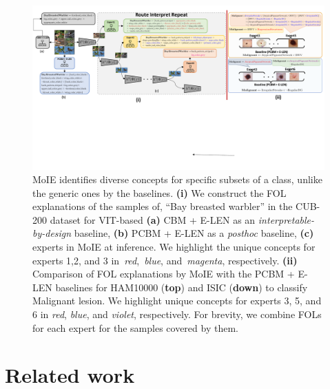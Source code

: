 \documentclass[nohyperref]{article}
\theoremstyle{plain}
\theoremstyle{definition}
\theoremstyle{remark}
\begin{document}
\begin{figure}[t]
\vskip 0.1in
\begin{center}
\centerline{\includegraphics[width=\linewidth]{figures/main/Results_all.pdf}}
\caption{MoIE identifies diverse concepts for specific subsets of a class, unlike the generic ones by the baselines. \textbf{(i)} We construct the FOL explanations of the samples of, ``Bay breasted warbler'' in the CUB-200 dataset for VIT-based \textbf{(a)} CBM + E-LEN as an \emph{interpretable-by-design} baseline, \textbf{(b)} PCBM + E-LEN as a \emph{posthoc} baseline, \textbf{(c)} experts in MoIE at inference. We highlight the unique concepts for experts 1,2, and 3 in~\emph{red},~\emph{blue}, and~\emph{magenta}, respectively. \textbf{(ii)} Comparison of FOL explanations by MoIE with the PCBM + E-LEN baselines for HAM10000 (\textbf{top}) and ISIC (\textbf{down})  to classify Malignant lesion. We highlight unique concepts for experts 3, 5, and 6 in \emph{red}, \emph{blue}, and \emph{violet}, respectively. For brevity, we combine FOLs for each expert for the samples covered by them.}
\label{fig:local_ex_cub}
\end{center}
\vskip -0.1in
\end{figure}

\section{Related work}
%

\end{document}
